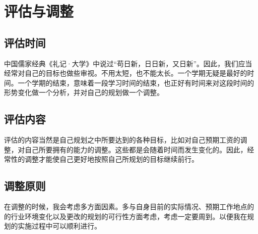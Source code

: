 \documentclass{article}
\begin{document}
\section{评估与调整}\par 
\subsection{评估时间}
中国儒家经典《礼记·大学》中说过“苟日新，日日新，又日新”。因此，我们应当经常对自己的目标也做些审视。不用太短，也不能太长。一个学期无疑是最好的时间。一个学期的结束，意味着一段学习时间的结束，也正好有时间来对这段时间的形势变化做一个分析，并对自己的规划做一个调整。\par
\subsection{评估内容}
评估的内容当然是自己规划之中所要达到的各种目标，比如对自己预期工资的调整，对自己所要拥有的能力的调整。这些都是会随着时间而发生变化的。因此，经常性的调整才能使自己更好地按照自己所规划的目标继续前行。\par
\subsection{调整原则}
在调整的时候，我会考虑多方面因素。多与自身目前的实际情况、预期工作地点的的行业环境变化以及更改的规划的可行性方面考虑，考虑一定要周到。以便我在规划的实施过程中可以顺利进行。\par
\end{document}
